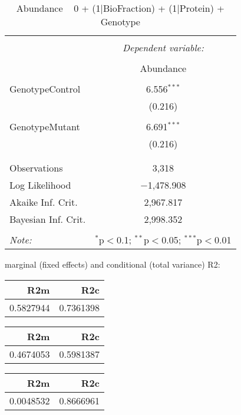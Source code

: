 \documentclass[11pt]{report}
\begin{document}
\begin{table}[!htbp] \centering 
  \caption{Abundance ~ 0 + (1|BioFraction) + (1|Protein) + Genotype} 
  \label{} 
\begin{tabular}{@{\extracolsep{5pt}}lc} 
\\[-1.8ex]\hline 
\hline \\[-1.8ex] 
 & \multicolumn{1}{c}{\textit{Dependent variable:}} \\ 
\cline{2-2} 
\\[-1.8ex] & Abundance \\ 
\hline \\[-1.8ex] 
 GenotypeControl & 6.556$^{***}$ \\ 
  & (0.216) \\ 
  & \\ 
 GenotypeMutant & 6.691$^{***}$ \\ 
  & (0.216) \\ 
  & \\ 
\hline \\[-1.8ex] 
Observations & 3,318 \\ 
Log Likelihood & $-$1,478.908 \\ 
Akaike Inf. Crit. & 2,967.817 \\ 
Bayesian Inf. Crit. & 2,998.352 \\ 
\hline 
\hline \\[-1.8ex] 
\textit{Note:}  & \multicolumn{1}{r}{$^{*}$p$<$0.1; $^{**}$p$<$0.05; $^{***}$p$<$0.01} \\ 
\end{tabular} 
\end{table} 
marginal (fixed effects) and conditional (total variance) R2:

\begin{tabular}{r|r}
\hline
R2m & R2c\\
\hline
0.5827944 & 0.7361398\\
\hline
\end{tabular}

\begin{tabular}{r|r}
\hline
R2m & R2c\\
\hline
0.4674053 & 0.5981387\\
\hline
\end{tabular}

\begin{tabular}{r|r}
\hline
R2m & R2c\\
\hline
0.0048532 & 0.8666961\\
\hline
\end{tabular}
\end{document}
